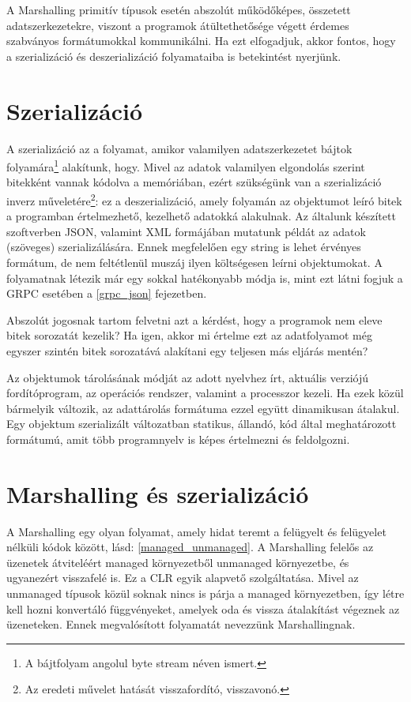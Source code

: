 \documentclass[tocnopagenum]{thesis-ekf}
\theoremstyle{definition}
\theoremstyle{remark}
\begin{document}
	A Marshalling primitív típusok esetén abszolút működőképes, összetett adatszerkezetekre, viszont a programok átültethetősége végett érdemes szabványos formátumokkal kommunikálni. Ha ezt elfogadjuk, akkor fontos, hogy a szerializáció és deszerializáció folyamataiba is betekintést nyerjünk.
	\section{Szerializáció}
	A szerializáció az a folyamat, amikor valamilyen adatszerkezetet bájtok folyamára\footnote{A bájtfolyam angolul byte stream néven ismert.} alakítunk, hogy. Mivel az adatok valamilyen elgondolás szerint bitekként vannak kódolva a memóriában, ezért szükségünk van a szerializáció inverz műveletére\footnote{Az eredeti művelet hatását visszafordító, visszavonó.}: ez a deszerializáció, amely folyamán az objektumot leíró bitek a programban értelmezhető, kezelhető adatokká alakulnak. Az általunk készített szoftverben JSON, valamint XML formájában mutatunk példát az adatok (szöveges) szerializálására. Ennek megfelelően egy string is lehet érvényes formátum, de nem feltétlenül muszáj ilyen költségesen leírni objektumokat. A folyamatnak létezik már egy sokkal hatékonyabb módja is, mint ezt látni fogjuk a GRPC esetében a \ref{grpc_json} fejezetben.
	
	Abszolút jogosnak tartom felvetni azt a kérdést, hogy a programok nem eleve bitek sorozatát kezelik? Ha igen, akkor mi értelme ezt az adatfolyamot még egyszer szintén bitek sorozatává alakítani egy teljesen más eljárás mentén?
	
	Az objektumok tárolásának módját az adott nyelvhez írt, aktuális verziójú fordítóprogram, az operációs rendszer, valamint a processzor kezeli. Ha ezek közül bármelyik változik, az adattárolás formátuma ezzel együtt dinamikusan átalakul. Egy objektum szerializált változatban statikus, állandó, kód által meghatározott formátumú, amit több programnyelv is képes értelmezni és feldolgozni. 
	\cite{sof_serialization}
	\section{Marshalling és szerializáció}
	A Marshalling egy olyan folyamat, amely hidat teremt a felügyelt és felügyelet nélküli kódok között, lásd: \ref{managed_unmanaged}. A Marshalling felelős az üzenetek átviteléért managed környezetből unmanaged környezetbe, és ugyanezért visszafelé is. Ez a CLR egyik alapvető szolgáltatása. Mivel az unmanaged típusok közül soknak nincs is párja a managed környezetben, így létre kell hozni konvertáló függvényeket, amelyek oda és vissza átalakítást végeznek az üzeneteken. Ennek megvalósított folyamatát nevezzünk Marshallingnak.
	\cite{marshalling_serialization}
\end{document}
